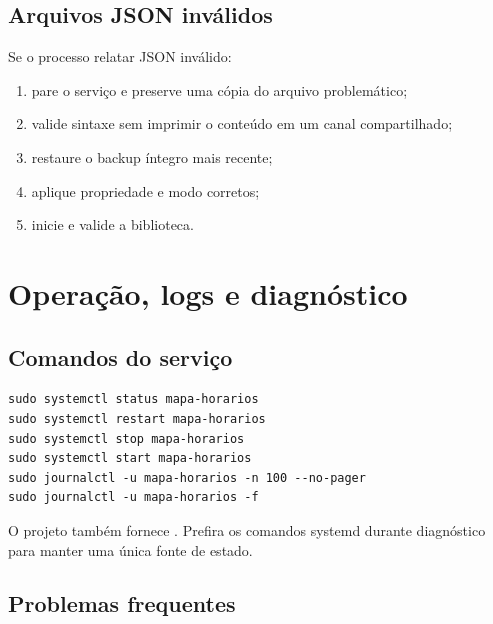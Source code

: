 \section{Arquivos JSON inválidos}

Se o processo relatar JSON inválido:

\begin{enumerate}
  \item pare o serviço e preserve uma cópia do arquivo problemático;
  \item valide sintaxe sem imprimir o conteúdo em um canal compartilhado;
  \item restaure o backup íntegro mais recente;
  \item aplique propriedade e modo corretos;
  \item inicie e valide a biblioteca.
\end{enumerate}

\chapter{Operação, logs e diagnóstico}

\section{Comandos do serviço}

\begin{lstlisting}
sudo systemctl status mapa-horarios
sudo systemctl restart mapa-horarios
sudo systemctl stop mapa-horarios
sudo systemctl start mapa-horarios
sudo journalctl -u mapa-horarios -n 100 --no-pager
sudo journalctl -u mapa-horarios -f
\end{lstlisting}

O projeto também fornece . Prefira os comandos systemd durante diagnóstico para manter uma única fonte de estado.

\section{Problemas frequentes}

